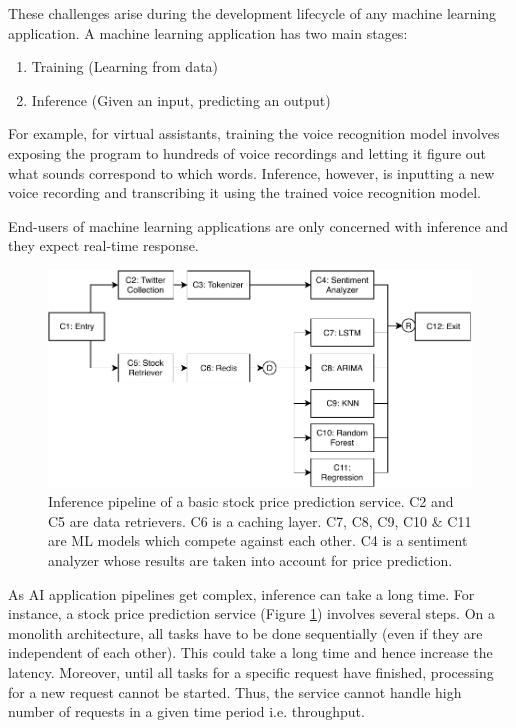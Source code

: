 \documentclass{report}
\begin{document}
These challenges arise during the development lifecycle of any machine learning application. A machine learning application has two main stages:
\begin{enumerate}
  \item Training (Learning from data)
  \item Inference (Given an input, predicting an output)
\end{enumerate}

For example, for virtual assistants, training the voice recognition model involves exposing the program to hundreds of voice recordings and letting it figure out what sounds correspond to which words. Inference, however, is inputting a new voice recording and transcribing it using the trained voice recognition model.

End-users of machine learning applications are only concerned with inference and they expect real-time response.

\begin{figure}
  \centering
  \includegraphics[width=\textwidth]{StockPriceServiceBasic.pdf}
  \caption{Inference pipeline of a basic stock price prediction service. C2 and C5 are data retrievers. C6 is a caching layer. C7, C8, C9, C10 \& C11 are ML models which compete against each other. C4 is a sentiment analyzer whose results are taken into account for price prediction.}
  \label{fig:StockPriceServiceBasic}
\end{figure}

As AI application pipelines get complex, inference can take a long time. For instance, a stock price prediction service (Figure \ref{fig:StockPriceServiceBasic}) involves several steps. On a monolith architecture, all tasks have to be done sequentially (even if they are independent of each other). This could take a long time and hence increase the latency. Moreover, until all tasks for a specific request have finished, processing for a new request cannot be started. Thus, the service cannot handle high number of requests in a given time period i.e. throughput.
\end{document}
